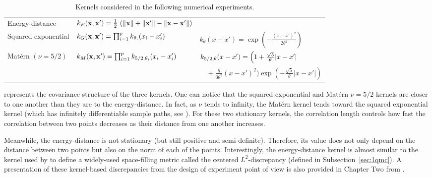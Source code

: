 \begin{table}
    \begin{center}
    \caption{Kernels considered in the following numerical experiments.}
    \begin{tabular*}{\textwidth}{@{\extracolsep\fill}lll@{}}
    \hline
    Energy-distance & $k_E({\bf x},{\bf x}') = \frac12\, \left(\| {\bf x} \| + \| {\bf x}' \| - \| {\bf x}-{\bf x}' \|\right)$ & \\
    Squared exponential & $k_G({\bf x},{\bf x}') = \prod_{i=1}^{p} k_{\theta_{i}}(x_{i}-x'_i)$ & $k_{\theta}(x-x') = \exp \left(- \frac{(x-x')^2}{2\theta^2}\right)$\\
    Mat\'{e}rn $(\nu = 5/2)$ & $k_M({\bf x},{\bf x}') = \prod_{i=1}^{p} k_{5/2,\theta_{i}}(x_{i}-x'_i)$
     & $k_{5/2,\theta}(x-x') = \Bigl(1 + \frac{\sqrt{5}}{\theta} |x - x'|$ \\ 
     & & $\quad + \frac{5}{3 \theta^2} (x - x')^2 \Bigr) \exp \left( - \frac{\sqrt{5}}{\theta} |x - x'| \right)$ \\
    \hline
    \end{tabular*}
    \label{tab:kernels}
    \end{center}
\end{table}

 represents the covariance structure of the three kernels. 
One can notice that the squared exponential and Mat\'{e}rn $\nu = 5/2$ kernels are closer to one another than they are to the energy-distance. 
In fact, as $\nu$ tends to infinity, the Mat\'{e}rn kernel tends toward the squared exponential kernel (which has infinitely differentiable sample paths, see \citealp{rasmussen_2006}). 
For these two stationary kernels, the correlation length controls how fast the correlation between two points decreases as their distance from one another increases. 

Meanwhile, the energy-distance is not stationary (but still positive and semi-definite). 
Therefore, its value does not only depend on the distance between two points but also on the norm of each of the points.
Interestingly, the energy-distance kernel is almost similar to the kernel used by \citet{hickernell_1998} to define a widely-used space-filling metric called the centered $L^2$-discrepancy (defined in Subsection~\ref{sec:1qmc}). 
A presentation of these kernel-based discrepancies from the design of experiment point of view is also provided in Chapter Two from \citet{fang_liu_2018}.  

